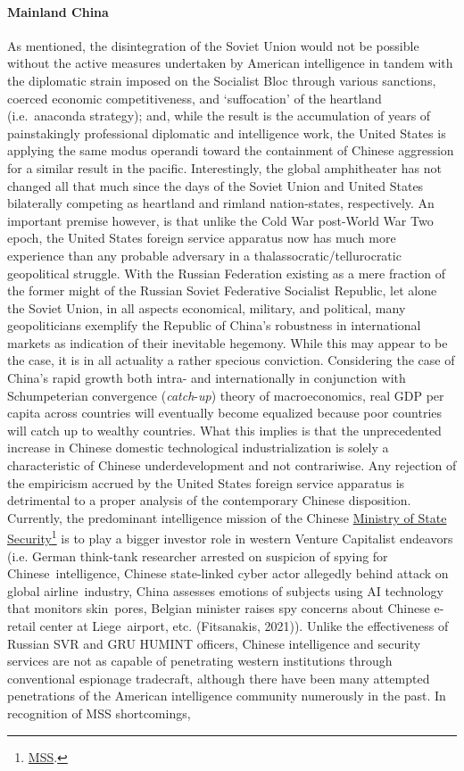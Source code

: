 \documentclass[12pt]{article}
\begin{document}
\paragraph{Mainland China} As mentioned, the disintegration of the Soviet Union would not be possible without the active measures undertaken by American intelligence in tandem with the diplomatic strain imposed on the Socialist Bloc through various sanctions, coerced economic competitiveness, and `suffocation' of the heartland (i.e.\ anaconda strategy); and, while the result is the accumulation of years of painstakingly professional diplomatic and intelligence work, the United States is applying the same modus operandi toward the containment of Chinese aggression for a similar result in the pacific. Interestingly, the global amphitheater has not changed all that much since the days of the Soviet Union and United States bilaterally competing as heartland and rimland nation-states, respectively. An important premise however, is that unlike the Cold War post-World War Two epoch, the United States foreign service apparatus now has much more experience than any probable adversary in a thalassocratic/tellurocratic geopolitical struggle. With the Russian Federation existing as a mere fraction of the former might of the Russian Soviet Federative Socialist Republic, let alone the Soviet Union, in all aspects economical, military, and political, many geopoliticians exemplify the Republic of China's robustness in international markets as indication of their inevitable hegemony. While this may appear to be the case, it is in all actuality a rather specious conviction. Considering the case of China's rapid growth both intra- and internationally in conjunction with Schumpeterian convergence (\emph{catch}-\emph{up}) theory of macroeconomics, real GDP per capita across countries will eventually become equalized because poor countries will catch up to wealthy countries. What this implies is that the unprecedented increase in Chinese domestic technological industrialization is solely a characteristic of Chinese underdevelopment and not contrariwise. Any rejection of the empiricism accrued by the United States foreign service apparatus is detrimental to a proper analysis of the contemporary Chinese disposition. Currently, the predominant intelligence mission of the Chinese \underline{Ministry of State Security}\footnote{\href{https://en.wikipedia.org/wiki/Ministry_of_State_Security_(China)}{MSS}.} is to play a bigger investor role in western Venture Capitalist endeavors (i.e. German think-tank researcher arrested on suspicion of spying for Chinese intelligence, Chinese state-linked cyber actor allegedly behind attack on global airline industry, China assesses emotions of subjects using AI technology that monitors skin pores, Belgian minister raises spy concerns about Chinese e-retail center at Liege airport, etc. (Fitsanakis, 2021)). Unlike the effectiveness of Russian SVR and GRU HUMINT officers, Chinese intelligence and security services are not as capable of penetrating western institutions through conventional espionage tradecraft, although there have been many attempted penetrations of the American intelligence community numerously in the past. In recognition of MSS shortcomings, 
\end{document}
